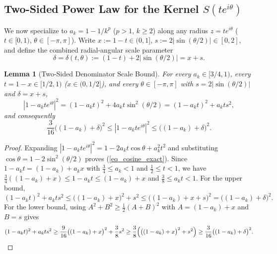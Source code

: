 \documentclass[11pt,reqno]{amsart}
\newtheorem{lem}[thm]{Lemma}
\numberwithin{equation}{section}
\begin{document}
\subsection{Two-Sided Power Law for the Kernel $S(t e^{i\theta})$}

We now specialize to $a_k = 1 - 1/k^p$ ($p > 1$, $k \ge 2$) along any radius $z = t e^{i\theta}$ ($t \in [0, 1)$, $\theta \in [-\pi, \pi]$). Write $x := 1 - t \in (0, 1]$, $s := 2|\sin(\theta/2)| \in [0, 2]$, and define the combined radial-angular scale parameter
\begin{equation} \label{eq_delta_scale}
  \delta = \delta(t, \theta) := (1 - t) + 2|\sin(\theta/2)| = x + s.
\end{equation}

\begin{lem}[Two-Sided Denominator Scale Bound] \label{lem_denom_scale}
For every $a_k \in [3/4, 1)$, every $t = 1 - x \in [1/2, 1)$ ($x \in (0, 1/2]$), and every $\theta \in [-\pi, \pi]$ with $s = 2|\sin(\theta/2)|$ and $\delta = x + s$,
\begin{equation} \label{eq_cosine_exact}
  |1 - a_k t e^{i\theta}|^2 = (1 - a_k t)^2 + 4 a_k t \sin^2(\theta/2) = (1 - a_k t)^2 + a_k t s^2,
\end{equation}
and consequently
\begin{equation} \label{eq_denom_sandwich}
  \frac{3}{16}\bigl((1 - a_k) + \delta\bigr)^2 \le |1 - a_k t e^{i\theta}|^2 \le \bigl((1 - a_k) + \delta\bigr)^2.
\end{equation}
\end{lem}
\begin{proof}
Expanding $|1 - a_k t e^{i\theta}|^2 = 1 - 2 a_k t \cos\theta + a_k^2 t^2$ and substituting $\cos\theta = 1 - 2\sin^2(\theta/2)$ proves (\ref{eq_cosine_exact}). Since $1 - a_k t = (1 - a_k) + a_k x$ with $\frac{3}{4} \le a_k < 1$ and $\frac{1}{2} \le t < 1$, we have $\frac{3}{4}((1 - a_k) + x) \le 1 - a_k t \le (1 - a_k) + x$ and $\frac{3}{8} \le a_k t < 1$. For the upper bound,
\[
  (1 - a_k t)^2 + a_k t s^2 \le \bigl((1 - a_k) + x\bigr)^2 + s^2 \le \bigl((1 - a_k) + x + s\bigr)^2 = \bigl((1 - a_k) + \delta\bigr)^2.
\]
For the lower bound, using $A^2 + B^2 \ge \frac{1}{2}(A + B)^2$ with $A = (1 - a_k) + x$ and $B = s$ gives
\[
  (1 - a_k t)^2 + a_k t s^2 \ge \frac{9}{16}\bigl((1-a_k)+x\bigr)^2 + \frac{3}{8} s^2 \ge \frac{3}{8}\Bigl(\bigl((1-a_k)+x\bigr)^2 + s^2\Bigr) \ge \frac{3}{16}\bigl((1-a_k) + \delta\bigr)^2. \qedhere
\]
\end{proof}
\end{document}

